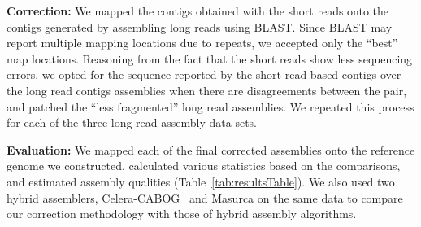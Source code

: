 \documentclass[12pt]{article}
\begin{document}
\textbf{Correction:} We mapped the contigs obtained with the short reads onto the contigs generated by assembling long reads using BLAST\cite{blast}. Since BLAST may report multiple mapping locations due to repeats, we accepted only the ``best'' map locations. Reasoning from the fact that the short reads show less sequencing errors, we opted for the sequence reported by the short read based contigs over the long read contigs assemblies when there are disagreements between the pair, and patched the ``less fragmented'' long read assemblies. We repeated this process for each of the three long read assembly data sets.

\textbf{Evaluation:} We mapped each of the final corrected assemblies onto the reference genome we constructed, calculated various statistics based on the comparisons, and estimated assembly qualities (Table~\ref{tab:resultsTable}). We also used  two hybrid assemblers, Celera-CABOG~\cite{cabogMiller:2008} and Masurca \cite{masurcaZimin:2013} on the same data to compare our correction methodology with those of hybrid assembly algorithms.

\end{document}

